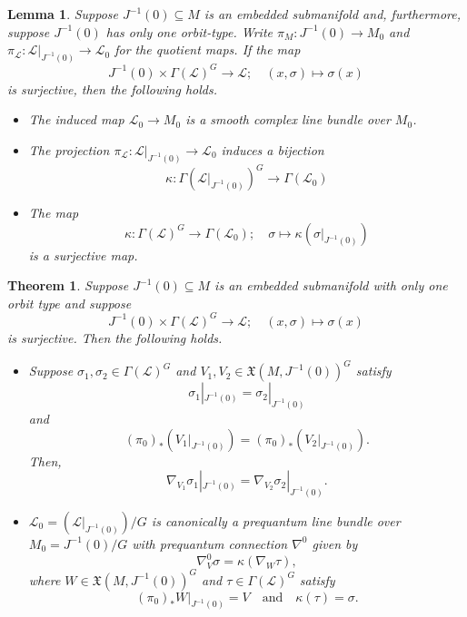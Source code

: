\documentclass[10pt,a4paper]{amsart}
\newtheorem{lem}{Lemma}
\newtheorem{theorem}{Theorem}
\newcommand{\mfX}{\mathfrak{X}}
\begin{document}
\begin{lem}\label{lem: non-singular reduction of line bundle}
Suppose $J^{-1}(0)\subseteq M$ is an embedded submanifold and, furthermore, suppose $J^{-1}(0)$ has only one orbit-type. Write $\pi_M:J^{-1}(0)\to M_0$ and $\pi_\mathcal{L}:\mathcal{L}|_{J^{-1}(0)}\to \mathcal{L}_0$ for the quotient maps. If the map
\begin{equation}
J^{-1}(0)\times \Gamma(\mathcal{L})^G\to \mathcal{L};\quad (x,\sigma)\mapsto \sigma(x)
\end{equation}
is surjective, then the following holds.
\begin{itemize}
    \item[(i)] The induced map $\mathcal{L}_0\to M_0$ is a smooth complex line bundle over $M_0$.
    \item[(ii)] The projection $\pi_\mathcal{L}:\mathcal{L}|_{J^{-1}(0)}\to \mathcal{L}_0$ induces a bijection
    $$
    \kappa:\Gamma(\mathcal{L}|_{J^{-1}(0)})^G\to \Gamma(\mathcal{L}_0)
    $$
    \item[(iii)] The map
    $$
    \kappa:\Gamma(\mathcal{L})^G\to \Gamma(\mathcal{L}_0);\quad \sigma\mapsto \kappa(\sigma|_{J^{-1}(0)})
    $$
    is a surjective map. 
\end{itemize}
\end{lem}

\begin{theorem}\label{thm: can reduce non-singular}
Suppose $J^{-1}(0)\subseteq M$ is an embedded submanifold with only one orbit type and suppose
$$
J^{-1}(0)\times \Gamma(\mathcal{L})^G\to \mathcal{L};\quad (x,\sigma)\mapsto \sigma(x)
$$
is surjective. Then the following holds.
\begin{itemize}
    \item[(i)] Suppose $\sigma_1,\sigma_2\in\Gamma(\mathcal{L})^G$ and $V_1,V_2\in\mfX(M,J^{-1}(0))^G$ satisfy 
    $$
    \sigma_1|_{J^{-1}(0)}=\sigma_2|_{J^{-1}(0)}
    $$
    and 
    $$
    (\pi_0)_*(V_1|_{J^{-1}(0)})=(\pi_0)_*(V_2|_{J^{-1}(0)}).
    $$
    Then,
    \begin{equation}
    \nabla_{V_1}\sigma_1|_{J^{-1}(0)}=\nabla_{V_2}\sigma_2|_{J^{-1}(0)}.
    \end{equation}
    \item[(ii)] $\mathcal{L}_0=(\mathcal{L}|_{J^{-1}(0)})/G$ is canonically a prequantum line bundle over $M_0=J^{-1}(0)/G$ with prequantum connection $\nabla^0$ given by
    $$
    \nabla^0_V\sigma=\kappa(\nabla_W\tau),
    $$
    where $W\in \mfX(M,J^{-1}(0))^G$ and $\tau\in\Gamma(\mathcal{L})^G$ satisfy
    $$
    (\pi_0)_*W|_{J^{-1}(0)}=V\quad\text{and}\quad \kappa(\tau)=\sigma.
    $$
\end{itemize}
\end{theorem}
\end{document}
